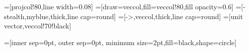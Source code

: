 
\tikzset{>=latex} %
=[projcol!80,line width=0.08] %
=[draw=veccol,fill=veccol!80,fill opacity=0.6]
=[-stealth,myblue,thick,line cap=round]
=[->,veccol,thick,line cap=round]
=[unit vector,veccol!70!black]
\usetikzlibrary{angles,quotes} %
\contourlength{1.3pt}

\def\tdplotdefinepoints(#1,#2,#3)(#4,#5,#6)(#7,#8,#9){%
  \pgfmathsetmacro{\tdplotvertexx}{#1}
  \pgfmathsetmacro{\tdplotvertexy}{#2}
  \pgfmathsetmacro{\tdplotvertexz}{#3}  \pgfmathsetmacro{\tdplotax}{#4}
  \pgfmathsetmacro{\tdplotay}{#5}  \pgfmathsetmacro{\tdplotaz}{#6}
  \pgfmathsetmacro{\tdplotbx}{#7}  \pgfmathsetmacro{\tdplotby}{#8}
  \pgfmathsetmacro{\tdplotbz}{#9}
}


\newcommand{\ToXYZ}[2]{
    {\R*sin(#1)*cos(#2)}, %
    {\R*cos(#1)*cos(#2)}, %
    {\R*sin(#2)}          %
}
=[inner sep=0pt, outer sep=0pt,%
    minimum size=2pt,fill=black,shape=circle]
 \def\aofv{103}

\def\RotationX{-30}
\def\RotationY{-20}
   
